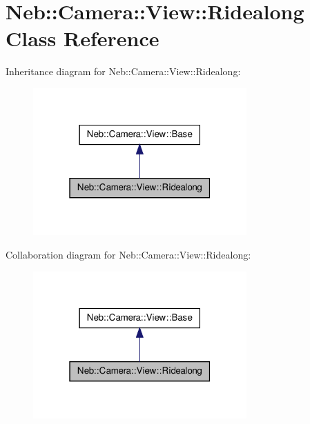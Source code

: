 \hypertarget{classNeb_1_1Camera_1_1View_1_1Ridealong}{\section{\-Neb\-:\-:\-Camera\-:\-:\-View\-:\-:\-Ridealong \-Class \-Reference}
\label{classNeb_1_1Camera_1_1View_1_1Ridealong}
}


\-Inheritance diagram for \-Neb\-:\-:\-Camera\-:\-:\-View\-:\-:\-Ridealong\-:\nopagebreak
\begin{figure}[H]
\begin{center}
\leavevmode
\includegraphics[width=232pt]{classNeb_1_1Camera_1_1View_1_1Ridealong__inherit__graph}
\end{center}
\end{figure}


\-Collaboration diagram for \-Neb\-:\-:\-Camera\-:\-:\-View\-:\-:\-Ridealong\-:\nopagebreak
\begin{figure}[H]
\begin{center}
\leavevmode
\includegraphics[width=232pt]{classNeb_1_1Camera_1_1View_1_1Ridealong__coll__graph}
\end{center}
\end{figure}
